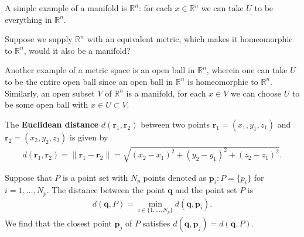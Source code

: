  A simple example of a manifold is $\mathbb{R}^n$: for each $x \in \mathbb{R}^n$ we can take $U$ to be everything in $\mathbb{R}^n$. 
 
 \begin{quiz}
 	 Suppose we supply $\mathbb{R}^n$ with an equivalent metric, which makes it homeomorphic to $\mathbb{R}^n$, would it also be a manifold?
 \end{quiz}
 
 Another example of a metric space is an open ball in $\mathbb{R}^n$, wherein one can take $U$ to be the entire open ball since an open ball in $\mathbb{R}^n$ is homeomorphic to $\mathbb{R}^n$. Similarly, an open subset $V$ of $\mathbb{R}^n$ is a manifold, \ie for each $x \in V$ we can choose $U$ to be some open ball with $x\in U \subset V$.
 
 
 The \textbf{Euclidean distance} $d(\bm{r}_1, \bm{r}_2)$ between two points $\bm{r}_1 = (x_1, y_1, z_1)$ and $\bm{r}_2 = (x_2, y_2, z_2)$ is given by 
 \begin{align}
 d(\bm{r}_1, \bm{r}_2) = \|\bm{r}_1 - \bm{r}_2\| =\sqrt{(x_2-x_1)^2 + (y_2-y_1)^2 + (z_2-z_1)^2}.
 \end{align}
 
 Suppose that $P$ is a point set with $N_p$ points denoted as $\bm{p}_i: P=\{p_i\}$ for $i=1,\ldots,N_p$. The distance between the point $\bm{q}$ and the point set $P$ is
 \begin{align}
 	d(\bm{q}, P) = \min_{i\in \{1,\ldots,N_p\}}{d(\bm{q}, \bm{p}_i)}.
 \end{align}
 We find that the closest point $\bm{p}_j$ of $P$  satisfies $d(\bm{q}, \bm{p}_j) = d(\bm{q}, P)$.
 
